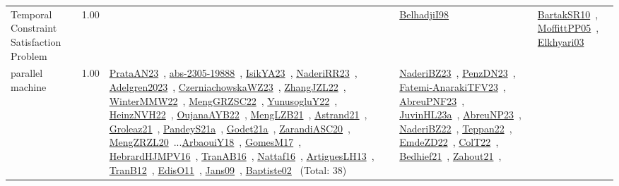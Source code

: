 {\begin{longtable}{p{3cm}r>{\raggedright\arraybackslash}p{6cm}>{\raggedright\arraybackslash}p{6cm}>{\raggedright\arraybackslash}p{8cm}}
\index{Temporal Constraint Satisfaction Problem}\index{Classification!Temporal Constraint Satisfaction Problem}Temporal Constraint Satisfaction Problem &  1.00 &  & \href{../works/BelhadjiI98.pdf}{BelhadjiI98}~\cite{BelhadjiI98} & \href{../works/BartakSR10.pdf}{BartakSR10}~\cite{BartakSR10}, \href{../works/MoffittPP05.pdf}{MoffittPP05}~\cite{MoffittPP05}, \href{../works/Elkhyari03.pdf}{Elkhyari03}~\cite{Elkhyari03}\\
\index{parallel machine}\index{Classification!parallel machine}parallel machine &  1.00 & \href{../works/PrataAN23.pdf}{PrataAN23}~\cite{PrataAN23}, \href{../works/abs-2305-19888.pdf}{abs-2305-19888}~\cite{abs-2305-19888}, \href{../works/IsikYA23.pdf}{IsikYA23}~\cite{IsikYA23}, \href{../works/NaderiRR23.pdf}{NaderiRR23}~\cite{NaderiRR23}, \href{../works/Adelgren2023.pdf}{Adelgren2023}~\cite{Adelgren2023}, \href{../works/CzerniachowskaWZ23.pdf}{CzerniachowskaWZ23}~\cite{CzerniachowskaWZ23}, \href{../works/ZhangJZL22.pdf}{ZhangJZL22}~\cite{ZhangJZL22}, \href{../works/WinterMMW22.pdf}{WinterMMW22}~\cite{WinterMMW22}, \href{../works/MengGRZSC22.pdf}{MengGRZSC22}~\cite{MengGRZSC22}, \href{../works/YunusogluY22.pdf}{YunusogluY22}~\cite{YunusogluY22}, \href{../works/HeinzNVH22.pdf}{HeinzNVH22}~\cite{HeinzNVH22}, \href{../works/OujanaAYB22.pdf}{OujanaAYB22}~\cite{OujanaAYB22}, \href{../works/MengLZB21.pdf}{MengLZB21}~\cite{MengLZB21}, \href{../works/Astrand21.pdf}{Astrand21}~\cite{Astrand21}, \href{../works/Groleaz21.pdf}{Groleaz21}~\cite{Groleaz21}, \href{../works/PandeyS21a.pdf}{PandeyS21a}~\cite{PandeyS21a}, \href{../works/Godet21a.pdf}{Godet21a}~\cite{Godet21a}, \href{../works/ZarandiASC20.pdf}{ZarandiASC20}~\cite{ZarandiASC20}, \href{../works/MengZRZL20.pdf}{MengZRZL20}~\cite{MengZRZL20}...\href{../works/ArbaouiY18.pdf}{ArbaouiY18}~\cite{ArbaouiY18}, \href{../works/GomesM17.pdf}{GomesM17}~\cite{GomesM17}, \href{../works/HebrardHJMPV16.pdf}{HebrardHJMPV16}~\cite{HebrardHJMPV16}, \href{../works/TranAB16.pdf}{TranAB16}~\cite{TranAB16}, \href{../works/Nattaf16.pdf}{Nattaf16}~\cite{Nattaf16}, \href{../works/ArtiguesLH13.pdf}{ArtiguesLH13}~\cite{ArtiguesLH13}, \href{../works/TranB12.pdf}{TranB12}~\cite{TranB12}, \href{../works/EdisO11.pdf}{EdisO11}~\cite{EdisO11}, \href{../works/Jans09.pdf}{Jans09}~\cite{Jans09}, \href{../works/Baptiste02.pdf}{Baptiste02}~\cite{Baptiste02} (Total: 38) & \href{../works/NaderiBZ23.pdf}{NaderiBZ23}~\cite{NaderiBZ23}, \href{../works/PenzDN23.pdf}{PenzDN23}~\cite{PenzDN23}, \href{../works/Fatemi-AnarakiTFV23.pdf}{Fatemi-AnarakiTFV23}~\cite{Fatemi-AnarakiTFV23}, \href{../works/AbreuPNF23.pdf}{AbreuPNF23}~\cite{AbreuPNF23}, \href{../works/JuvinHL23a.pdf}{JuvinHL23a}~\cite{JuvinHL23a}, \href{../works/AbreuNP23.pdf}{AbreuNP23}~\cite{AbreuNP23}, \href{../works/NaderiBZ22.pdf}{NaderiBZ22}~\cite{NaderiBZ22}, \href{../works/Teppan22.pdf}{Teppan22}~\cite{Teppan22}, \href{../works/EmdeZD22.pdf}{EmdeZD22}~\cite{EmdeZD22}, \href{../works/ColT22.pdf}{ColT22}~\cite{ColT22}, \href{../works/Bedhief21.pdf}{Bedhief21}~\cite{Bedhief21}, \href{../works/Zahout21.pdf}{Zahout21}~\cite{Zahout21}, 
\end{longtable}}
